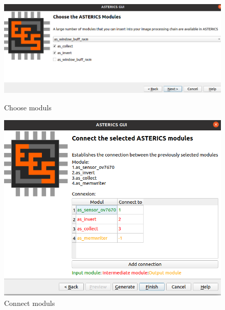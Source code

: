 \begin{figure}[!ht]
\begin{minipage}{0.45\textwidth}
			\centering
			\includegraphics[width=\textwidth]{figs/gui/choose}
			\caption{Choose moduls}
			\label{fig:06-05-wizard_choose}
		\end{minipage} 
		\hfill
		\begin{minipage}{0.45\textwidth}
			\centering
			\includegraphics[width=\textwidth,]{figs/gui/connection}
			\caption{Connect moduls}
			\label{fig:06-05-wizard_connexion}
		\end{minipage}
	\end{figure}
	
